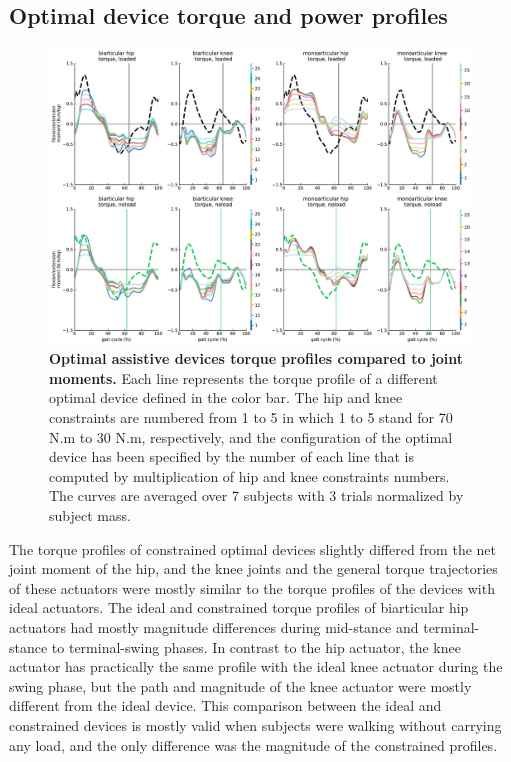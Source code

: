 \documentclass[10pt,letterpaper]{article}
\begin{document}
\subsection*{Optimal device torque and power profiles }
\begin{figure}[ht]   
	\centering
	\includegraphics[width=\linewidth]{Pareto_Simulations_Figures/PaperFigure_Paretofront_TorqueProfiles.pdf}
	\vspace{1mm}
	\caption{{\small\textbf{Optimal assistive devices torque profiles compared to joint moments.} Each line represents the torque profile of a different optimal device defined in the color bar. The hip and knee constraints are numbered from 1 to 5 in which 1 to 5 stand for 70 N.m to 30 N.m, respectively, and the configuration of the optimal device has been specified by the number of each line that is computed by multiplication of hip and knee constraints numbers. The curves are averaged over 7 subjects with 3 trials normalized by subject mass.}}
	\label{Fig_Paretofronts_Torque_Profiles}
\end{figure}
The torque profiles of constrained optimal devices slightly differed from the net joint moment of the hip, and the knee joints and the general torque trajectories of these actuators were mostly similar to the torque profiles of the devices with ideal actuators. The ideal and constrained torque profiles of biarticular hip actuators had mostly magnitude differences during mid-stance and terminal-stance to terminal-swing phases. In contrast to the hip actuator, the knee actuator has practically the same profile with the ideal knee actuator during the swing phase, but the path and magnitude of the knee actuator were mostly different from the ideal device. This comparison between the ideal and constrained devices is mostly valid when subjects were walking without carrying any load, and the only difference was the magnitude of the constrained profiles.\\
\end{document}
